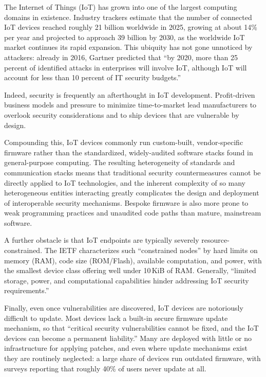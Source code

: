 \documentclass[conference]{IEEEtran}
\begin{document}
The Internet of Things (IoT) has grown into one of the largest computing domains in existence. Industry trackers estimate that the number of connected IoT devices reached roughly 21 billion worldwide in 2025, growing at about 14\% per year and projected to approach 39 billion by 2030, \cite{iotanalytics2025state} as the worldwide IoT market continues its rapid expansion. \cite{statista_iot_outlook} This ubiquity has not gone unnoticed by attackers: already in 2016, Gartner predicted that ``by 2020, more than 25 percent of identified attacks in enterprises will involve IoT, although IoT will account for less than 10 percent of IT security budgets.'' \cite{gartner2016iotsec}

Indeed, security is frequently an afterthought in IoT development. Profit-driven business models and pressure to minimize time-to-market lead manufacturers to overlook security considerations and to ship devices that are vulnerable by design. \cite{neshenko2019iot}

Compounding this, IoT devices commonly run custom-built, vendor-specific firmware rather than the standardized, widely-audited software stacks found in general-purpose computing. The resulting heterogeneity of standards and communication stacks means that traditional security countermeasures cannot be directly applied to IoT technologies, \cite{sicari2015iot} and the inherent complexity of so many heterogeneous entities interacting greatly complicates the design and deployment of interoperable security mechanisms. \cite{roman2013iot} Bespoke firmware is also more prone to weak programming practices and unaudited code paths than mature, mainstream software. \cite{neshenko2019iot}

A further obstacle is that IoT endpoints are typically severely resource-constrained. The IETF characterizes such ``constrained nodes'' by hard limits on memory (RAM), code size (ROM/Flash), available computation, and power, with the smallest device class offering well under 10\,KiB of RAM. \cite{bormann2014rfc7228} Generally, ``limited storage, power, and computational capabilities hinder addressing IoT security requirements.'' \cite{neshenko2019iot}

Finally, even once vulnerabilities are discovered, IoT devices are notoriously difficult to update. Most devices lack a built-in secure firmware update mechanism, so that ``critical security vulnerabilities cannot be fixed, and the IoT devices can become a permanent liability.'' \cite{zandberg2019firmware} Many are deployed with little or no infrastructure for applying patches, \cite{antonakakis2017mirai} and even where update mechanisms exist they are routinely neglected: a large share of devices run outdated firmware, with surveys reporting that roughly 40\% of users never update at all. \cite{neshenko2019iot}
\end{document}
